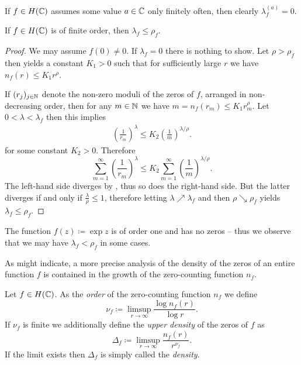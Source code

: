 If $f \in H(\mathbb{C})$ assumes some value $a \in \mathbb{C}$ only finitely often, then clearly $\lambda_f^{(a)} = 0$.

\begin{theorem} \label{thm:inequality-order-exponent-of-convergence}
    If $f \in H(\mathbb{C})$ is of finite order, then $\lambda_f \leq \rho_f$.
\end{theorem}

\begin{proof}
    We may assume $f(0) \neq 0$. If $\lambda_f = 0$ there is nothing to show. Let $\rho > \rho_f$ then  yields a constant $K_1 > 0$ such that for sufficiently large $r$ we have $n_f(r) \leq K_1 r^{\rho}$.
    
    If $(r_j)_{j \in \mathbb{N}}$ denote the non-zero moduli of the zeros of $f$, arranged in non-decreasing order, then for any $m \in \mathbb{N}$ we have $m = n_f(r_m) \leq K_1 r_m^{\rho}$. Let $0 < \lambda < \lambda_f$ then this implies
    \begin{align*}
        \left( \frac{1}{r_m} \right)^{\lambda} \leq K_2 \left( \frac{1}{m} \right)^{\lambda/\rho}.
    \end{align*}
    for some constant $K_2 > 0$. Therefore
    \begin{equation*}
        \sum_{m=1}^\infty \left( \frac{1}{r_m} \right)^{\lambda} \leq K_2 \sum_{m=1}^\infty \left( \frac{1}{m} \right)^{\lambda/\rho}.
    \end{equation*}
    The left-hand side diverges by , thus so does the right-hand side. But the latter diverges if and only if $\frac{\lambda}{\rho} \leq 1$, therefore letting $\lambda \nearrow \lambda_f$ and then $\rho \searrow \rho_f$ yields $\lambda_f \leq \rho_f$.
\end{proof}

\begin{remark}
    The function $f(z) \coloneqq \exp z$ is of order one and has no zeros -- thus we observe that we may have $\lambda_f < \rho_f$ in some cases.
\end{remark}

As  might indicate, a more precise analysis of the density of the zeros of an entire function $f$ is contained in the growth of the zero-counting function $n_f$.

\begin{definition} \label{def:order-density-zero-counting}
    Let $f \in H(\mathbb{C})$. As the \emph{order} of the zero-counting function $n_f$ we define
    \begin{equation}
        \nu_f \coloneqq \limsup_{r \to \infty} \frac{\log n_f(r)}{\log r}.
    \end{equation}
    If $\nu_f$ is finite we additionally define the \emph{upper density} of the zeros of $f$ as
    \begin{equation}
        \Delta_f \coloneqq \limsup_{r \to \infty} \frac{n_f(r)}{r^{\nu_f}}.
    \end{equation}
    If the limit exists then $\Delta_f$ is simply called the \emph{density}.
\end{definition}

